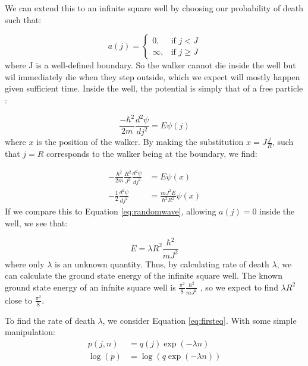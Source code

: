 \documentclass[journal]{IEEEtran}
\begin{document}
We can extend this to an infinite square well by choosing our probability of
death such that:

\begin{equation}
  \label{eq:squarewell}
    a(j) =
    \begin{cases}
      0,& \text{if } j < J\\
      \infty,& \text{if } j \geq J
    \end{cases}
    \nonumber
\end{equation}
where J is a well-defined boundary. So the walker cannot die inside the well but
wil immediately die when they step outside, which we expect will mostly
happen given sufficient time. Inside the well, the potential is simply that of a
free particle \cite{Bransden2003}:

\begin{equation}
  \frac{-\hbar^2}{2m}\frac{d^2 \psi}{dj^2} = E\psi(j)
  \nonumber
\end{equation}
where $x$ is the position of the walker. By making the substitution
$x=J\frac{j}{R}$, such that $j=R$ corresponds to the walker being at the
boundary, we find:

\begin{equation}
  \begin{split}
    -\frac{\hbar^2}{2m}\frac{R^2}{J^2}\frac{d^2\psi}{dj^2} &= E\psi(x)\\
    -\frac{1}{2}\frac{d^2\psi}{dj^2} &= \frac{mJ^2E}{\hbar^2R^2}\psi(x)
  \end{split}
  \nonumber
\end{equation}
If we compare this to Equation \ref{eq:randomwave}, allowing $a(j) = 0$ inside
the well, we see that:

\begin{equation}
  E = \lambda R^2 \frac{\hbar^2}{mJ^2}
  \label{eq:kasia}
\end{equation}
where only $\lambda$ is an unknown quantity. Thus, by calculating rate of death
$\lambda$, we can calculate the ground state energy of the infinite square
well. The known ground state energy of an infnite square well is
$\frac{\pi^2}{8}\frac{\hbar^2}{mJ^2}$ \cite{Davies1998}, so we expect to find $\lambda
R^2$ close to $\frac{\pi^2}{8}$.

To find the rate of death $\lambda$, we consider Equation \ref{eq:firsteq}. With
some simple manipulation:
\begin{equation}
  \begin{split}
    p(j, n) & = q(j) \exp(-\lambda n)\\
    \log(p) & = \log(q \exp(-\lambda n)) \\
  \end{split}
  \nonumber
\end{equation}
\end{document}
